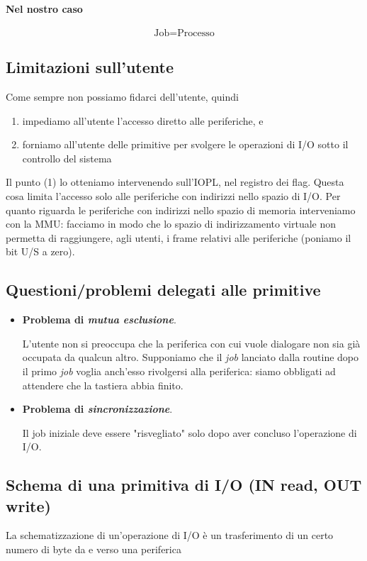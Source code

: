 \paragraph{Nel nostro caso} \[\boxed{\text{Job} = \text{Processo}}\]

\subsection{Limitazioni sull'utente} Come sempre non possiamo fidarci dell'utente, quindi
\begin{enumerate}
	\item impediamo all'utente l'accesso diretto alle periferiche, e
	\item forniamo all'utente delle primitive per svolgere le operazioni di I/O sotto il controllo del sistema
\end{enumerate} 
Il punto (1) lo otteniamo intervenendo sull'IOPL, nel registro dei flag. Questa cosa limita l'accesso solo alle periferiche con indirizzi nello spazio di I/O. Per quanto riguarda le periferiche con indirizzi nello spazio di memoria interveniamo con la MMU: facciamo in modo che lo spazio di indirizzamento virtuale non permetta di raggiungere, agli utenti, i frame relativi alle periferiche (poniamo il bit U/S a zero). 

\subsection{Questioni/problemi delegati alle primitive}
\begin{itemize}
	\item \textbf{Problema di \emph{mutua esclusione}}.
	
	L'utente non si preoccupa che la periferica con cui vuole dialogare non sia già occupata da qualcun altro. Supponiamo che il \emph{job} lanciato dalla routine dopo il primo \emph{job} voglia anch'esso rivolgersi alla periferica: siamo obbligati ad attendere che la tastiera abbia finito. 
	
	\item \textbf{Problema di \emph{sincronizzazione}}.
	
	Il job iniziale deve essere "risvegliato" solo dopo aver concluso l'operazione di I/O. 
\end{itemize} 

\subsection{Schema di una primitiva di I/O (IN read, OUT write)} La schematizzazione di un'operazione di I/O è un trasferimento di un certo numero di byte da e verso una periferica
